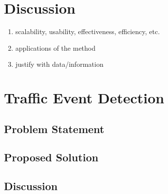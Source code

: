 \documentclass[a4paper,portrait,12pt]{article}
\begin{document}
\section{Discussion}
\label{section-discussion}
\begin{enumerate}
	\item scalability, usability, effectiveness, efficiency, etc.
	\item applications of the method
	\item justify with data/information
\end{enumerate}

\section{Traffic Event Detection}
\subsection{Problem Statement}
\subsection{Proposed Solution}
\subsection{Discussion}

\newpage
\nocite{*}


\end{document}
